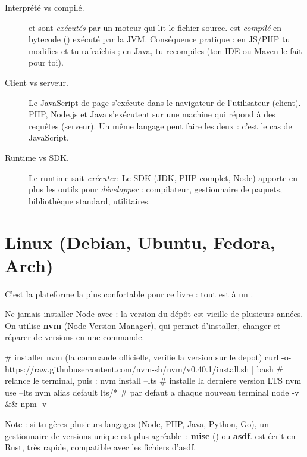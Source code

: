 \begin{description}
  \item[Interpr\'et\'e vs compil\'e.] \langjs{} et \langphp{} sont \emph{ex\'ecut\'es} par un moteur qui lit
        le fichier source. \langjava{} est \emph{compil\'e} en bytecode () ex\'ecut\'e
        par la JVM. Cons\'equence pratique : en JS/PHP tu modifies et tu rafra\^ichis ; en Java,
        tu recompiles (ton IDE ou Maven le fait pour toi).
  \item[Client vs serveur.] Le JavaScript de page s'ex\'ecute dans le navigateur de l'utilisateur
        (client). PHP, Node.js et Java s'ex\'ecutent sur une machine qui r\'epond \`a des requ\^etes
        (serveur). Un m\^eme langage peut faire les deux : c'est le cas de JavaScript.
  \item[Runtime vs SDK.] Le runtime sait \emph{ex\'ecuter}. Le SDK (JDK, PHP complet, Node) apporte
        en plus les outils pour \emph{d\'evelopper} : compilateur, gestionnaire de paquets,
        biblioth\`eque standard, utilitaires.
\end{description}

\section{Linux (Debian, Ubuntu, Fedora, Arch)}

C'est la plateforme la plus confortable pour ce livre : tout est \`a un .

Ne jamais installer Node avec  : la version du d\'ep\^ot est vieille de plusieurs ann\'ees.
On utilise \textbf{nvm} (Node Version Manager), qui permet d'installer, changer et r\'eparer
de versions en une commande.

\begin{terminal}
# installer nvm (la commande officielle, verifie la version sur le depot)
curl -o- https://raw.githubusercontent.com/nvm-sh/nvm/v0.40.1/install.sh | bash
# relance le terminal, puis :
nvm install --lts          # installe la derniere version LTS
nvm use --lts
nvm alias default lts/*    # par defaut a chaque nouveau terminal
node -v && npm -v
\end{terminal}

Note : si tu g\`eres plusieurs langages (Node, PHP, Java, Python, Go), un gestionnaire de versions
unique est plus agr\'eable~: \textbf{mise} () ou
\textbf{asdf}.  est \'ecrit en Rust, tr\`es rapide, compatible
avec les fichiers  d'asdf.

